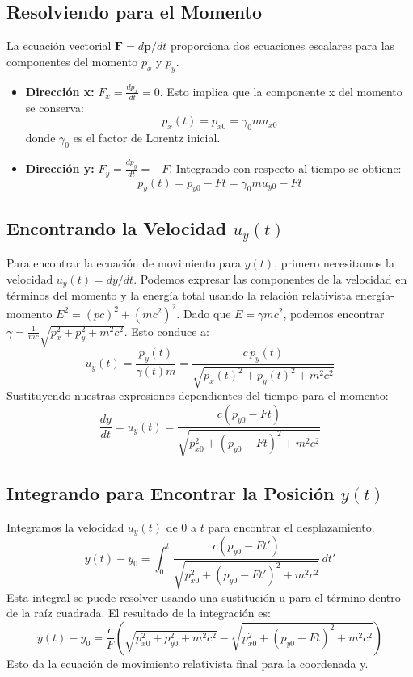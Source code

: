 \documentclass[11pt,a4paper]{article}
\begin{document}
\subsection{Resolviendo para el Momento}
La ecuación vectorial $\boldsymbol{F} = d\boldsymbol{p}/dt$ proporciona dos ecuaciones escalares para las componentes del momento $p_x$ y $p_y$.
\begin{itemize}
    \item \textbf{Dirección x:} $F_x = \frac{dp_x}{dt} = 0$. Esto implica que la componente x del momento se conserva:
    \[ p_x(t) = p_{x0} = \gamma_0 m u_{x0} \]
    donde $\gamma_0$ es el factor de Lorentz inicial.
    \item \textbf{Dirección y:} $F_y = \frac{dp_y}{dt} = -F$. Integrando con respecto al tiempo se obtiene:
    \[ p_y(t) = p_{y0} - Ft = \gamma_0 m u_{y0} - Ft \]
\end{itemize}

\subsection{Encontrando la Velocidad \texorpdfstring{$u_y(t)$}{uy(t)}}
Para encontrar la ecuación de movimiento para $y(t)$, primero necesitamos la velocidad $u_y(t) = dy/dt$. Podemos expresar las componentes de la velocidad en términos del momento y la energía total usando la relación relativista energía-momento $E^2 = (pc)^2 + (mc^2)^2$. Dado que $E=\gamma m c^2$, podemos encontrar $\gamma = \frac{1}{mc}\sqrt{p_x^2 + p_y^2 + m^2c^2}$. Esto conduce a:
\[ u_y(t) = \frac{p_y(t)}{\gamma(t) m} = \frac{c \, p_y(t)}{\sqrt{p_x(t)^2 + p_y(t)^2 + m^2c^2}} \]
Sustituyendo nuestras expresiones dependientes del tiempo para el momento:
\[ \frac{dy}{dt} = u_y(t) = \frac{c (p_{y0} - Ft)}{\sqrt{p_{x0}^2 + (p_{y0} - Ft)^2 + m^2c^2}} \]

\subsection{Integrando para Encontrar la Posición \texorpdfstring{$y(t)$}{y(t)}}
Integramos la velocidad $u_y(t)$ de $0$ a $t$ para encontrar el desplazamiento.
\[ y(t) - y_0 = \int_0^t \frac{c (p_{y0} - Ft')}{\sqrt{p_{x0}^2 + (p_{y0} - Ft')^2 + m^2c^2}} \, dt' \]
Esta integral se puede resolver usando una sustitución u para el término dentro de la raíz cuadrada. El resultado de la integración es:
\[ y(t) - y_0 = \frac{c}{F} \left( \sqrt{p_{x0}^2 + p_{y0}^2 + m^2c^2} - \sqrt{p_{x0}^2 + (p_{y0} - Ft)^2 + m^2c^2} \right) \]
Esto da la ecuación de movimiento relativista final para la coordenada y.
\end{document}
